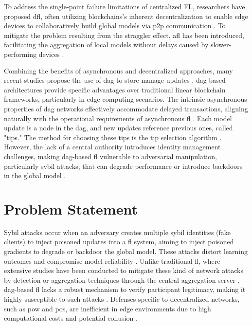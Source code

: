 To address the single-point failure limitations of centralized FL, researchers have proposed \ac{dfl}, often utilizing block\-chains's inherent decentralization to enable edge devices to collaboratively build global models via \ac{p2p} communication \cite{martinez_beltran_decentralized_2023} \cite{nguyen_federated_2021}. To mitigate the problem resulting from the straggler effect, \ac{afl} has been introduced, facilitating the aggregation of local models without delays caused by slower-performing devices \cite{vu_straggler_2021} \cite{zang_general_2023} \cite{lu_differentially_2020}. 

Combining the benefits of asynchronous and decentralized approaches, many recent studies propose the use of \ac{dag} to store manage updates \cite{xue_energy_2022} \cite{lu_blockchain_2020} \cite{yuan_chainsfl_2021} \cite{cao_dag-fl_2021} \cite{xiao_db-fl_2024} \cite{liu_decentralized_2024} \cite{pvn_edge-enabled_2024} \cite{beilharz_implicit_2021} \cite{huang_personalized_2024} \cite{schmid_tangle_2020} \cite{cao_toward_2023}. \ac{dag}-based architectures provide specific advantages over traditional linear blockchain frameworks, particularly in edge computing scenarios. The intrinsic asynchronous properties of \ac{dag} networks effectively accommodate delayed transactions, aligning naturally with the operational requirements of asynchronous \ac{fl} \cite{ko_asynchronous_2023} \cite{zhao_evaluating_2019}. Each model update is a node in the \ac{dag}, and new updates reference previous ones, called "tips." The method for choosing these tips is the tip selection algorithm \cite{xiao_fast_2022}. However, the lack of a central authority introduces identity management challenges, making \ac{dag}-based \ac{fl} vulnerable to adversarial manipulation, particularly sybil attacks, that can degrade performance or introduce backdoors in the global model\cite{ko_asynchronous_2023} \cite{fung_limitations_2020}.

\section{Problem Statement}
Sybil attacks occur when an adversary creates multiple sybil identities (fake clients) to inject poisoned updates into a \ac{fl} system, aiming to inject poisoned gradients to degrade or backdoor the global model. These attacks distort learning outcomes and compromise model reliability \cite{fung_limitations_2020} \cite{jiang_sybil_2021}. Unlike traditional \ac{fl}, where extensive studies have been conducted to mitigate these kind of network attacks by detection or aggregation techniques through the central aggregation server \cite{jiang_sybil_2021} \cite{ghafourian_safl_2024} \cite{rodriguez-barroso_dynamic_2022} \cite{malecki_simeon_2021} \cite{garcia-marquez_krum_2025}, \ac{dag}-based \ac{fl} lacks a robust mechanism to verify participant legitimacy, making it highly susceptible to such attacks \cite{ko_asynchronous_2023}. Defenses specific to decentralized networks, such as \ac{pow} and \ac{pos}, are inefficient in edge environments due to high computational costs and potential collusion \cite{puthal_proof_2019}.

